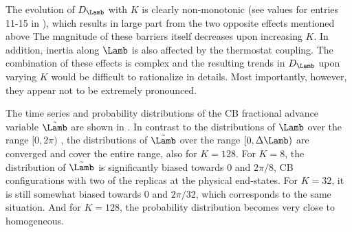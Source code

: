 %
The evolution of $D_{\Lamb}$ with $K$ is clearly non-monotonic (see values for entries 11-15 in ), 
which results in large part from the two opposite effects mentioned above
%
%
The magnitude of these barriers itself decreases upon increasing $K$. 
In addition, inertia along $\Lamb$ is also affected by the thermostat coupling. 
The combination of these effects is complex and the resulting trends in $D_{\Lamb}$ 
upon varying $K$ would be difficult to rationalize in details. 
Most importantly, however, they appear not to be extremely pronounced. 


The time series and probability distributions
of the CB fractional advance variable $\tilde{\Lamb}$ are shown in 
.
%
In contrast to the distributions of $\Lamb$ over the range $[0,2\pi)$ , the distributions of $\tilde{\Lamb}$
over the range $[0,\Delta \Lamb)$ are converged and cover the entire range, also for $K=128$. 
%
    For $K=8$, the distribution of $\tilde{\Lamb}$ is significantly biased towards 0 and $2\pi/8$,
    \ie{} CB configurations with two of the replicas at the physical end-states.
    For $K=32$, it is still somewhat biased towards 0 and $2\pi/32$, which corresponds to the same
    situation.
    And for $K=128$, the probability distribution becomes very close to homogeneous.
%


